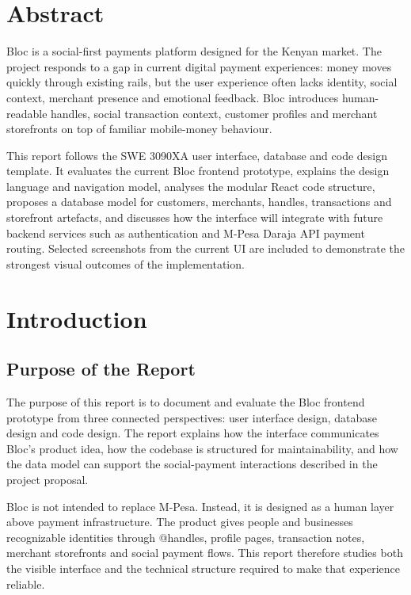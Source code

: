\documentclass[12pt,a4paper]{article}
\begin{document}
\section*{Abstract}
Bloc is a social-first payments platform designed for the Kenyan market. The project responds to a gap in current digital payment experiences: money moves quickly through existing rails, but the user experience often lacks identity, social context, merchant presence and emotional feedback. Bloc introduces human-readable handles, social transaction context, customer profiles and merchant storefronts on top of familiar mobile-money behaviour.

This report follows the SWE 3090XA user interface, database and code design template. It evaluates the current Bloc frontend prototype, explains the design language and navigation model, analyses the modular React code structure, proposes a database model for customers, merchants, handles, transactions and storefront artefacts, and discusses how the interface will integrate with future backend services such as authentication and M-Pesa Daraja API payment routing. Selected screenshots from the current UI are included to demonstrate the strongest visual outcomes of the implementation.

\newpage
\tableofcontents
\newpage
\listoffigures
\newpage


\section{Introduction}

\subsection{Purpose of the Report}
The purpose of this report is to document and evaluate the Bloc frontend prototype from three connected perspectives: user interface design, database design and code design. The report explains how the interface communicates Bloc's product idea, how the codebase is structured for maintainability, and how the data model can support the social-payment interactions described in the project proposal.

Bloc is not intended to replace M-Pesa. Instead, it is designed as a human layer above payment infrastructure. The product gives people and businesses recognizable identities through @handles, profile pages, transaction notes, merchant storefronts and social payment flows. This report therefore studies both the visible interface and the technical structure required to make that experience reliable.
\end{document}
